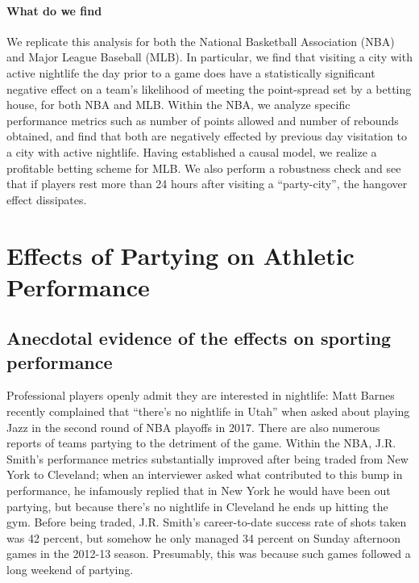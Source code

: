 \documentclass[letterpaper,12pt]{article}
\begin{document}
\paragraph{What do we find}
We replicate this analysis for both the National Basketball Association
(NBA) and Major League Baseball (MLB). In particular, we find that visiting
a city with active nightlife the day prior to a game does have a statistically
significant negative effect on a team's likelihood of meeting the point-spread set
by a betting house, for both NBA and MLB. Within the NBA, we analyze specific performance
metrics such as number of points allowed and number of rebounds obtained, and find that both are negatively effected by previous day visitation to a city with active nightlife. Having established a causal model, we realize a profitable betting scheme for MLB. We also perform a robustness check and see that if players rest more than
 24 hours after visiting a ``party-city'', the hangover effect dissipates.

\section{Effects of Partying on Athletic Performance}

\subsection{Anecdotal evidence of the effects on sporting performance}
Professional players openly admit they are interested in nightlife: Matt Barnes recently complained that 
``there's no nightlife in Utah'' when asked about playing Jazz in the second round of NBA playoffs 
in 2017.\citep{cestone}
There are also numerous reports of teams partying to the detriment of the game.
Within the NBA, J.R. Smith's performance metrics substantially improved 
 after being traded from New York to Cleveland; when an interviewer
asked what contributed to this bump in performance, he infamously replied
that in New York he would have been out partying, but because there's no nightlife in Cleveland he ends up hitting the gym.\citep{price,ley} Before being traded, J.R. Smith's career-to-date success rate of shots taken was 42 percent, but somehow he only managed 
34 percent on Sunday afternoon games in the 2012-13 season.
Presumably, this was because such games followed a long weekend of partying.\citep{princeofthecity}
\end{document}
